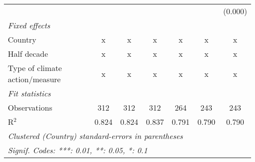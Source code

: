\begin{tabular}{lcccccc}
                                                    &         &         &                &                &                & (0.000)\\   
   \emph{Fixed effects}\\
   Country                                          & x       & x       & x              & x              & x              & x\\  
   Half decade                                      & x       & x       & x              & x              & x              & x\\  
   Type of climate action/measure                   & x       & x       & x              & x              & x              & x\\  
   \midrule \emph{Fit statistics}\\
   Observations                                     & 312     & 312     & 312            & 264            & 243            & 243\\  
   R$^2$                                            & 0.824   & 0.824   & 0.837          & 0.791          & 0.790          & 0.790\\  
   \midrule
   \multicolumn{7}{l}{\emph{Clustered (Country) standard-errors in parentheses}}\\
   \multicolumn{7}{l}{\emph{Signif. Codes: ***: 0.01, **: 0.05, *: 0.1}}\\
\end{tabular}
\par\endgroup


